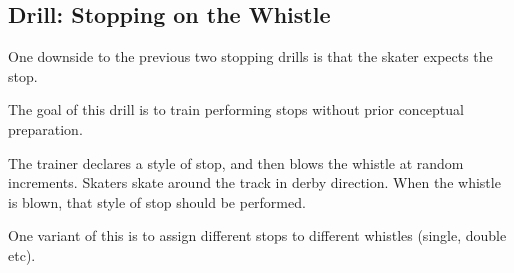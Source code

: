 \subsection*{Drill: Stopping on the Whistle}
One downside to the previous two stopping drills is that the skater expects the stop. 

The goal of this drill is to train performing stops without prior conceptual preparation.   

The trainer declares a style of stop, and then blows the whistle at random increments.  
Skaters skate around the track in derby direction.
When the whistle is blown, that style of stop should be performed.

One variant of this is to assign different stops to different whistles (single, double etc).
